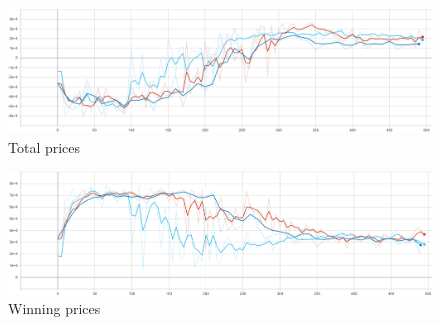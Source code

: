 \begin{figure}[h]
    \centering
    \includegraphics[width=15cm]{figures/algo_training_fig/total_prices.png}
    \caption{Total prices}
    \label{fig:algo_total_prices}
\end{figure}

\begin{figure}[h]
    \centering
    \includegraphics[width=15cm]{figures/algo_training_fig/total_winning_prices.PNG}
    \caption{Winning prices}
    \label{fig:algo_winning_prices}
\end{figure}

